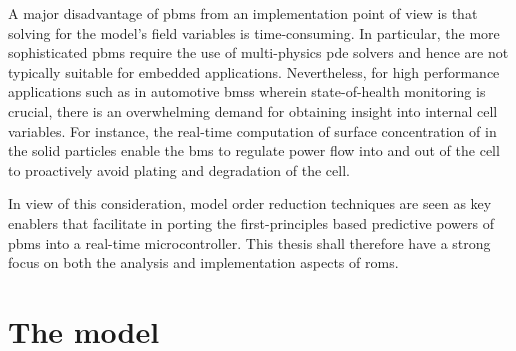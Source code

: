 
A major disadvantage of \glspl{pbm} from an implementation point of view is that
solving for  the model's field  variables is time-consuming. In  particular, the
more  sophisticated  \glspl{pbm}  require  the use  of  multi-physics  \gls{pde}
solvers  and  hence  are  not  typically  suitable  for  embedded  applications.
Nevertheless,  for   high  performance   applications  such  as   in  automotive
\glspl{bms}  wherein   state-of-health  monitoring  is  crucial,   there  is  an
overwhelming  demand for  obtaining insight  into internal  cell variables.  For
instance, the real-time computation of surface concentration of  in the
solid particles enable the \gls{bms} to regulate  power flow into and out of the
cell to proactively avoid plating and degradation of the cell.

In view of this consideration, model  order reduction techniques are seen as key
enablers that facilitate in porting the first-principles based predictive powers
of \glspl{pbm}  into a  real-time microcontroller.  This thesis  shall therefore
have  a  strong  focus  on  both the  analysis  and  implementation  aspects  of
\glspl{rom}.

\section{The  model}\label{sec:dfnmodel}

